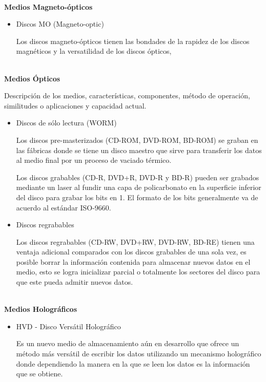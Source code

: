 \textbf{\\ Medios Magneto-\'{o}pticos \\}

\begin{itemize}

  \item Discos MO (Magneto-optic)
  
  Los discos magneto-\'{o}pticos tienen las bondades de la rapidez de los discos magn\'{e}ticos y la versatilidad de los discos \'{o}pticos, 
  
\end{itemize}

\textbf{\\ Medios \'{O}pticos \\}

Descripci\'{o}n de los medios, caracter\'{i}sticas, componentes, m\'{e}todo de operaci\'{o}n, similitudes o aplicaciones y capacidad actual.

\begin{itemize}

  \item Discos de s\'{o}lo lectura (WORM)
  
  Los discos pre-masterizados (CD-ROM, DVD-ROM, BD-ROM) se graban en las f\'{a}bricas donde se tiene un disco maestro que sirve para transferir los datos al medio final por un proceso de vaciado t\'{e}rmico.
  
  Los discos grabables (CD-R, DVD+R, DVD-R y BD-R) pueden ser grabados mediante un laser al fundir una capa de policarbonato en la superficie inferior del disco para grabar los bits en 1. El formato de los bits generalmente va de acuerdo al est\'{a}ndar ISO-9660.
  
  \item Discos regrabables
  
  Los discos regrabables (CD-RW, DVD+RW, DVD-RW, BD-RE) tienen una ventaja adicional comparados con los discos grabables de una sola vez, es posible borrar la informaci\'{o}n contenida para almacenar nuevos datos en el medio, esto se logra inicializar parcial o totalmente los sectores del disco para que este pueda admitir nuevos datos.
  
\end{itemize}

\textbf{\\ Medios Hologr\'{a}ficos \\}

\begin{itemize}

  \item HVD - Disco Vers\'{a}til Hologr\'{a}fico
  
  Es un nuevo medio de almacenamiento a\'{u}n en desarrollo que ofrece un m\'{e}todo m\'{a}s vers\'{a}til de escribir los datos utilizando un mecanismo hologr\'{a}fico donde dependiendo la manera en la que se leen los datos es la informaci\'{o}n que se obtiene.
  
\end{itemize}

